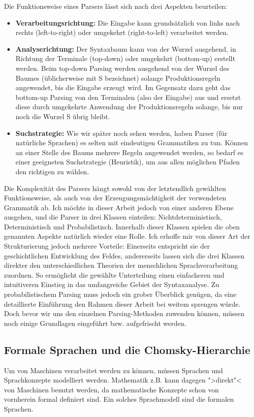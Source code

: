 \documentclass[12pt,a4paper]{article}
\theoremstyle{definition}
\begin{document}
		\noindent
		Die Funktionsweise eines Parsers lässt sich nach drei Aspekten beurteilen:
			\begin{itemize}
			\item{
				\textbf{Verarbeitungsrichtung:} Die Eingabe kann grundsätzlich von links nach rechts (left-to-right) oder umgekehrt (right-to-left) verarbeitet werden.
			}
			\item{
				\textbf{Analyserichtung:} Der Syntaxbaum kann von der Wurzel ausgehend, in Richtung der Terminale (top-down) oder umgekehrt (bottom-up) erstellt werden. Beim top-down Parsing werden ausgehend von der Wurzel des Baumes (üblicherweise mit S bezeichnet) solange Produktionsregeln angewendet, bis die Eingabe erzeugt wird. Im Gegensatz dazu geht das bottom-up Parsing von den Terminalen (also der Eingabe) aus und ersetzt diese durch umgekehrte Anwendung der Produktionsregeln solange, bis nur noch die Wurzel S übrig bleibt.
			}
			\item{
				\textbf{Suchstrategie:} Wie wir später noch sehen werden, haben Parser (für natürliche Sprachen) es selten mit eindeutigen Grammatiken zu tun. Können an einer Stelle des Baums mehrere Regeln angewendet werden, so bedarf es einer geeigneten Suchstrategie (Heuristik), um aus allen möglichen Pfaden den richtigen zu wählen.	
			}
			\end{itemize}

		\noindent
		Die Komplexität des Parsers hängt sowohl von der letztendlich gewählten Funktionsweise, als auch von der Erzeugungsmächtigkeit der verwendeten Grammatik ab. Ich möchte in dieser Arbeit jedoch von einer anderen Ebene ausgehen, und die  Parser in drei Klassen einteilen: Nichtdeterministisch, Deterministisch und Probabilistisch. Innerhalb dieser Klassen spielen die oben genannten Aspekte natürlich wieder eine Rolle. Ich erhoffe mir von dieser Art der Strukturierung jedoch mehrere Vorteile: Einerseits entspricht sie der geschichtlichen Entwicklung des Feldes, andererseits lassen sich die drei Klassen direkter den unterschiedlichen Theorien der menschlichen Sprachverarbeitung zuordnen. So ermöglicht die gewählte Unterteilung einen einfacheren und intuitiveren Einstieg in das umfangreiche Gebiet der Syntaxanalyse. Zu probabilistischem Parsing muss jedoch ein grober Überblick genügen, da eine detaillierte Einführung den Rahmen dieser Arbeit bei weitem sprengen würde. Doch bevor wir uns den einzelnen Parsing-Methoden zuwenden können, müssen noch einige Grundlagen eingeführt bzw. aufgefrischt werden.

	\subsection{Formale Sprachen und die Chomsky-Hierarchie}
		Um von Maschinen verarbeitet werden zu können, müssen Sprachen und Sprachkonzepte modelliert werden. Mathematik z.B. kann dagegen ">direkt"< von Maschinen benutzt werden, da mathematische Konzepte schon von vornherein formal definiert sind. Ein solches Sprachmodell sind die formalen Sprachen.
	
\end{document}
